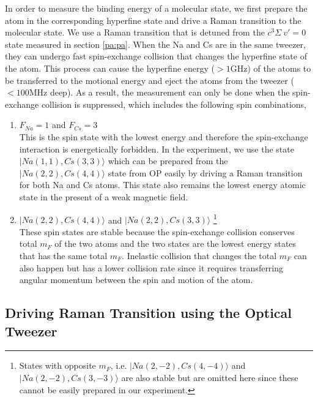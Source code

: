 In order to measure the binding energy of a molecular state,
we first prepare the atom in the corresponding hyperfine state
and drive a Raman transition to the molecular state.
We use a Raman transition that is detuned from the $c^3\Sigma\ v'=0$ state measured
in section \ref{pa:pa}.
When the Na and Cs are in the same tweezer,
they can undergo fast spin-exchange collision that changes the hyperfine state of the atom.
This process can cause the hyperfine energy ($>1\mathrm{GHz}$) of the atoms
to be transferred to the motional energy
and eject the atoms from the tweezer ($<100\mathrm{MHz}$ deep).
As a result, the measurement can only be done when the spin-exchange collision is suppressed,
which includes the following spin combinations,
\begin{enumerate}
\item $F_{Na}=1$ and $F_{Cs}=3$\\
  This is the spin state with the lowest energy and therefore the spin-exchange interaction
  is energetically forbidden.
  In the experiment, we use the state $|Na(1, 1),Cs(3, 3)\rangle$
  which can be prepared from the $|Na(2, 2),Cs(4, 4)\rangle$ state from OP
  easily by driving a Raman transition for both Na and Cs atoms.
  This state also remains the lowest energy atomic state in the present of a weak magnetic field.
\item $|Na(2, 2),Cs(4, 4)\rangle$ and $|Na(2, 2),Cs(3, 3)\rangle$
  \footnote{States with opposite $m_F$, i.e.
    $|Na(2, -2),Cs(4, -4)\rangle$ and $|Na(2, -2),Cs(3, -3)\rangle$ are also stable
    but are omitted here since these cannot be easily prepared in our experiment.}\\
  These spin states are stable because the spin-exchange collision conserves total $m_F$
  of the two atoms and
  the two states are the lowest energy states that has the same total $m_F$.
  Inelastic collision that changes the total $m_F$ can also happen
  but has a lower collision rate since it requires transferring angular momentum
  between the spin and motion of the atom.
\end{enumerate}

\subsection{Driving Raman Transition using the Optical Tweezer}

